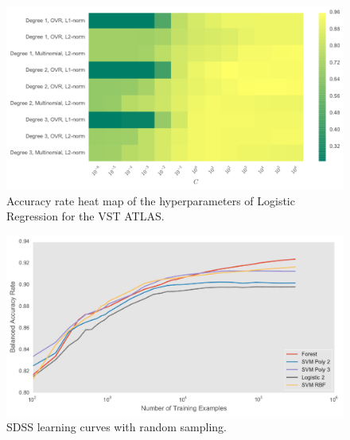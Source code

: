 \begin{figure}[tbp]
	\centering
	\includegraphics[width=\textwidth]{figures/heat_vstatlas_vgridsearch_logistic}
	\caption{Accuracy rate heat map of the hyperparameters of Logistic Regression for the VST ATLAS.}
	\label{fig:vst_heat_logistic}
\end{figure}


\begin{figure}[tbp]
	\centering
	\includegraphics[width=\textwidth]{figures/learning_curves_sdss_random}
	\caption{SDSS learning curves with random sampling.}
	\label{fig:sdss_learning}
\end{figure}





